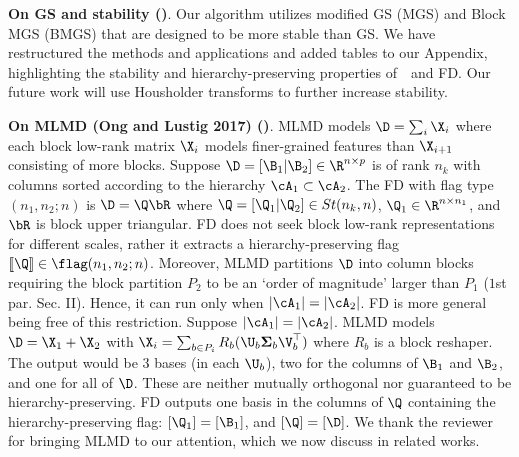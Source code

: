 \documentclass[10pt,twocolumn,letterpaper]{article}
\begin{document}



\noindent \textbf{On GS and stability (\Rone)}.
Our algorithm utilizes modified GS (MGS) and Block MGS (BMGS) that are designed to be more stable than GS. We have restructured the methods and applications and added tables to our Appendix, highlighting the stability and hierarchy-preserving properties of~\algname~and FD. 
Our future work will use Housholder transforms to further increase stability. 

\noindent \textbf{On MLMD (Ong and Lustig 2017) (\Rfour)}. MLMD models $\D = \sum_i \X_i$ where each block low-rank matrix $\X_i$ models finer-grained features than $\X_{i+1}$ consisting of more blocks. Suppose $\D = [\B_1|\B_2]\in \R^{n \times p}$ is of rank $n_k$ with columns sorted according to the hierarchy $\cA_1 \subset \cA_2$. The FD with flag type $(n_1,n_2;n)$ is $\D = \Q \bR$ where $\Q = [\Q_1 | \Q_2] \in St(n_k,n)$, $\Q_1 \in \R^{n \times n_1}$, and $\bR$ is block upper triangular. FD does not seek block low-rank representations for different scales, rather it extracts a hierarchy-preserving flag $[\![\Q]\!] \in \flag(n_1,n_2;n)$. Moreover, MLMD partitions $\D$ into column blocks requiring the block partition $P_2$ to be an `order of magnitude' larger than $P_1$ ($1$st par. Sec. II). Hence, it can run only when $|\cA_1| = |\cA_2|$. FD is more general being free of this restriction. Suppose $|\cA_1| = |\cA_2|$. MLMD models $\D = \X_1 + \X_2$ with $\X_i = \sum_{b \in P_i} R_b (\U_b \boldsymbol{\Sigma}_b \V^\top_b)$ where $R_b$ is a block reshaper. The output would be $3$ bases (in each $\U_b$), two for the columns of $\B_1$ and $\B_2$, and one for all of $\D$. These are neither mutually orthogonal nor guaranteed to be hierarchy-preserving. FD outputs one basis in the columns of $\Q$ containing the hierarchy-preserving flag: $[\Q_1]=[\B_1]$, and $[\Q] = [\D]$. We thank the reviewer for bringing MLMD to our attention, which we now discuss in related works.
\end{document}
